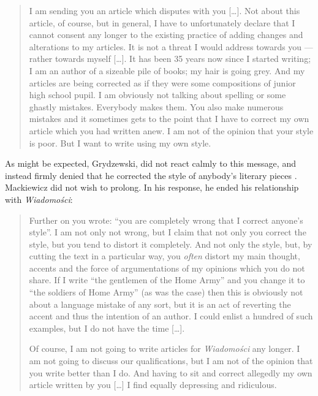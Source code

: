 \begin{paper}
\begin{quote}
I am sending you an article which disputes with you {[}\ldots{}{]}. Not
about this article, of course, but in general, I have to unfortunately
declare that I cannot consent any longer to the existing practice of
adding changes and alterations to my articles. It is not a threat I
would address towards you --- rather towards myself {[}\ldots{}{]}. It has
been 35 years now since I started writing; I am an author of a sizeable
pile of books; my hair is going grey. And my articles are being
corrected as if they were some compositions of junior high school pupil.
I am obviously not talking about spelling or some ghastly mistakes.
Everybody makes them. You also make numerous mistakes and it sometimes
gets to the point that I have to correct my own article which you had
written anew. I am not of the opinion that your style is poor. But I
want to write using my own style.
\begin{flushright}
\citep[130--31]{mackiewicz_listy_2010}
\end{flushright}
\end{quote}


\noindent As might be expected, Grydzewski, did not react
calmly to this message, and instead firmly denied that he
corrected the style of anybody's literary pieces \citep[93]{lewandowski_gleboki_1995}. Mackiewicz did not
wish to prolong. In his response, he ended his relationship with \emph{Wiadomości}:

\begin{quote}
Further on you wrote: ``you are completely wrong that I correct
anyone's style''. I am not only not wrong, but I claim that not only you
correct the style, but you tend to distort it completely. And not only
the style, but, by cutting the text in a particular way, you
\emph{often} distort my main thought, accents and the force of
argumentations of my opinions which you do not share. If I write ``the
gentlemen of the Home Army'' and you change it to ``the soldiers of Home
Army'' (as was the case) then this is obviously not about a language
mistake of any sort, but it is an act of reverting the accent and thus
the intention of an author. I could enlist a hundred of such examples,
but I do not have the time {[}\ldots{}{]}.

\newpage

Of course, I am not going to write articles for \emph{Wiadomości} any
longer. I am not going to discuss our qualifications, but I am not of
the opinion that you write better than I do. And having to sit and
correct allegedly my own article written by you {[}\ldots{}{]} I find
equally depressing and ridiculous.
\begin{flushright}
\citep[135--36]{mackiewicz_listy_2010}
\end{flushright}
\end{quote}


\end{paper}
